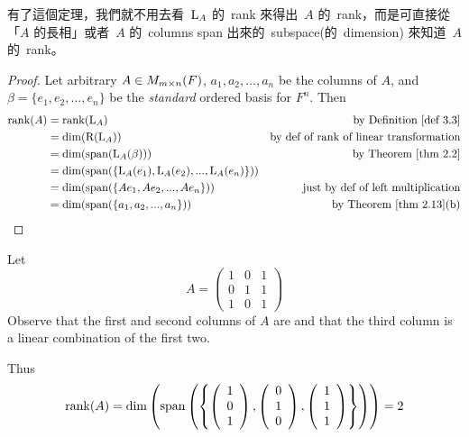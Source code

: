 \begin{note}
有了這個定理，我們就不用去看\ \(\mathrm{L}_A\) 的\ rank 來得出\ \(A\) 的\ rank，而是可直接從「\(A\) 的長相」或者\ \(A\) 的\ columns span 出來的\ subspace(的\ dimension) 來知道\ \(A\) 的\ rank。
\end{note}

\begin{proof}
Let arbitrary \(A \in M_{m \times n}(F)\),
\(a_1, a_2, ..., a_n\) be the columns of \(A\),
and \(\beta = \{ e_1, e_2, ..., e_n \}\) be the \emph{standard} ordered basis for \(F^n\).
Then
\begin{align*}
    \rank(A) & = \rank(\LMTRAN_A) & \text{by \DEF{3.3}} \\
             & = \dim(\RANGE(\LMTRAN_A)) & \text{by def of rank of \LTRAN{}} \\
             & = \dim(\spann(\LMTRAN_A(\beta))) & \text{by \THM{2.2}} \\
             & = \dim(\spann(\{ \LMTRAN_A(e_1), \LMTRAN_A(e_2), ..., \LMTRAN_A(e_n) \})) \\
             & = \dim(\spann(\{ Ae_1, Ae_2, ..., Ae_n \})) & \text{just by def of left multiplication} \\
             & = \dim(\spann(\{ a_1, a_2, ..., a_n \})) & \text{by \THM{2.13}(b)}
\end{align*}
\end{proof}

\begin{example} \label{example 3.2.1}
Let
\[
    A=\left(\begin{array}{lll}
        1 & 0 & 1 \\
        0 & 1 & 1 \\
        1 & 0 & 1
    \end{array}\right)
\]
Observe that the first and second columns of \(A\) are \LID{} and that the third column is a linear combination of the first two.

Thus
\[
    \mathrm{rank}(A) =
    \dim
        \left(
        \operatorname{span}\left(\left\{
            \left(\begin{array}{l}
                1 \\
                0 \\
                1
            \end{array}\right),
            \left(\begin{array}{l}
                0 \\
                1 \\
                0
            \end{array}\right),
            \left(\begin{array}{l}
                1 \\
                1 \\
                1
            \end{array}
        \right)\right\}\right)
        \right)
    = 2
\]
\end{example}

